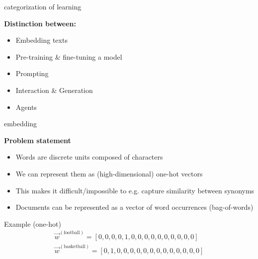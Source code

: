 \begin{vbframe}{categorization of learning}

\vfill

\textbf{Distinction between:}

	\begin{itemize}
		\item Embedding texts
		\item Pre-training \& fine-tuning a model
		\item Prompting
		\item Interaction \& Generation
		\item Agents
	\end{itemize}

\vfill

\end{vbframe}



\begin{vbframe}{embedding}

\vfill

\textbf{Problem statement}

\begin{itemize}
	\item Words are discrete units composed of characters
	\item We can represent them as (high-dimensional) one-hot vectors
	\item This makes it difficult/impossible to e.g. capture similarity between synonyms
	\item Documents can be represented as a vector of word occurrences (bag-of-words)
\end{itemize}
	
\begin{exampleblock}{Example (one-hot)}
	\begin{align*}
			\vec w^{({\text{football}})} = [0,0,0,0,1,0,0,0,0,0,0,0,0,0,0]\\\vec w^{({\text{basketball}})} = [0,1,0,0,0,0,0,0,0,0,0,0,0,0,0]
	\end{align*}
\end{exampleblock}

\vfill

\end{vbframe}


